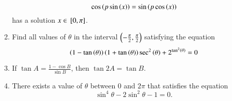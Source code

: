 \begin{enumerate}[label=\thesubsection.\arabic*,ref=\thesubsection.\theenumi]
$$
\cos {\ensuremath{\left(p\sin \left(x\right)\right)}}=\sin {\ensuremath{\left(p\cos \left(x\right)\right)}}
$$
has a solution $ x \in {}\left[0, \pi\right]$.
\item Find all values of $\theta$ in the interval $\left(-\frac{\pi}{2},\frac{\pi}{2}\right)$ satisfying the equation 
\hfill{}
$$
\left(1-\tan \left(\theta\right)\right)\left(1+\tan \left(\theta\right)\right)\sec^2\left(\theta\right)+ 2^{\tan^2\left(\theta\right)}=0
$$
\item If $\tan A = \frac{1-\cos B}{\sin B}$, then $\tan 2A = \tan B$.
\hfill{}
\item There exists a value of $\theta$ between $0$ and $2\pi$ that satisfies the equation
\hfill{}
	$$\sin^{4}\theta -2\sin^{2}\theta-1=0.$$
\end{enumerate}
